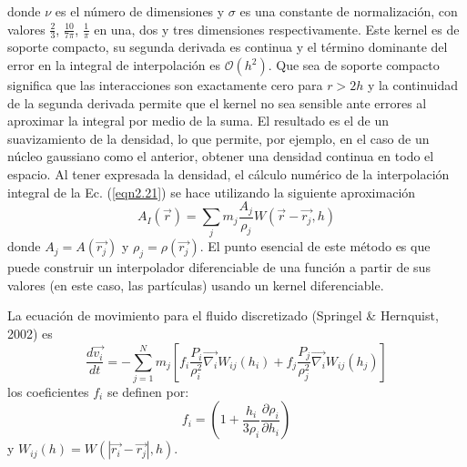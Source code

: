 \documentclass[a4paper,openright,12pt]{book}
\begin{document}
donde $\nu$ es el número de dimensiones y $\sigma$ es una constante de normalización, con valores $\frac{2}{3}$, $\frac{10}{7 \pi}$, $\frac{1}{\pi}$ en una, dos y tres dimensiones respectivamente. Este kernel es de soporte compacto, su segunda derivada es continua y el término dominante del error en la integral de interpolación es $\mathcal{O}(h^{2})$. Que sea de soporte compacto significa que las interacciones son exactamente cero para $r>2h$ y la continuidad de la segunda derivada permite que el kernel no sea sensible ante errores al aproximar la integral por medio de la suma.
El resultado es el de un suavizamiento de la densidad, lo que permite, por ejemplo, en el caso de un núcleo gaussiano como el anterior, obtener una densidad continua en todo el espacio. Al tener expresada la densidad, el cálculo numérico de la interpolación integral de la Ec. (\ref{eqn2.21}) se hace utilizando la siguiente aproximación 
\begin{equation}
 A_{I}(\vec{r})
 =
 \sum_{j} m_{j} \frac{A_{j}}{\rho_{j}} W(\vec{r}- \vec{r_{j}},h)\label{eqn2.29}
\end{equation}
donde $A_{j}=A(\vec{r_{j}})$ y $\rho_{j}=\rho(\vec{r_{j}})$. El punto esencial de este método es que puede construir un interpolador diferenciable de una función a partir de sus valores (en este caso, las partículas) usando un kernel diferenciable. 

La ecuación de movimiento para el fluido discretizado (Springel \& Hernquist, 2002) es
\begin{equation}
 \frac{d \vec{v_{i}}}{d t}
 =
 -\sum_{j=1}^{N} m_{j}
 \left[f_{i} \frac{P_{i}}{\rho_{i}^{2}}\vec{\nabla_{i}}W_{ij}(h_{i})
 +
 f_{j} \frac{P_{j}}{\rho_{j}^{2}}\vec{\nabla_{i}}W_{ij}(h_{j})\right]\label{eqn2.30}
\end{equation}
los coeficientes $f_{i}$ se definen por:
\begin{equation}
  f_{i}
  =
  \left(
  1 + \frac{h_{i}}{3\rho_{i}} \frac{\partial \rho_{i}}{\partial h_{i}}
  \right)\label{eqn2.31}
\end{equation}
y $W_{ij}(h) = W(|\vec{r_{i}}-\vec{r_{j}}|,h)$.
\\\\
\end{document}
